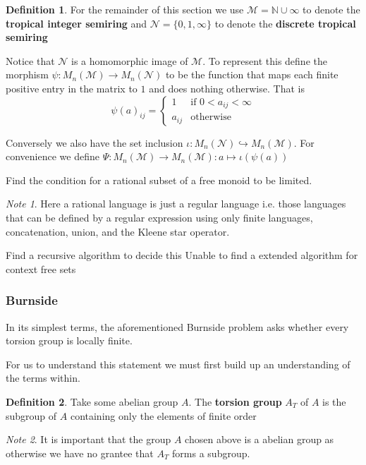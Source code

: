 \documentclass[12pt,a4paper]{amsart}
\newcommand{\N}{\mathbb{N}}
\newcommand{\TM}{\mathcal{M}}
\newcommand{\TN}{\mathcal{N}}
\theoremstyle{definition}
\newtheorem{defn}{Definition}[section]
\theoremstyle{remark}
\newtheorem*{note}{Note}
\begin{document}
\begin{defn}
For the remainder of this section we use $\TM=\N\cup\infty$ to denote the \textbf{tropical integer semiring} and $\TN = \{ 0,1,\infty \}$ to denote the \textbf{discrete tropical semiring}

Notice that $\TN$ is a homomorphic image of $\TM$. To represent this define the morphism $\psi:M_n(\TM)\to M_n(\TN)$ to be the function that maps each finite positive entry in the matrix to $1$ and does nothing otherwise. That is
\begin{equation}
    \psi(a)_{ij} = \begin{cases}
    1&\text{if } 0 < a_{ij} < \infty\\
    a_{ij}&\text{otherwise}
    \end{cases}
\end{equation}

Conversely we also have the set inclusion $\iota:M_n(\TN)\hookrightarrow M_n(\TM)$.
For convenience we define $\Psi:M_n(\TM)\to M_n(\TM): a\mapsto \iota(\psi(a))$ 
\end{defn}

Find the condition for a rational subset of a free monoid to be limited. 
\begin{note}
Here a rational language is just a regular language i.e. those languages that can be defined by a regular expression using only finite languages, concatenation, union, and the Kleene star operator.
\end{note}
Find a recursive algorithm to decide this
Unable to find a extended algorithm for context free sets
\subsubsection{Burnside}

In its simplest terms, the aforementioned Burnside problem asks whether every torsion group is locally finite.

For us to understand this statement we must first build up an understanding of the terms within.

\begin{defn}
Take some abelian group $A$. The \textbf{torsion group} $A_T$ of $A$ is the subgroup of $A$ containing only the elements of finite order
\end{defn}

\begin{note}
It is important that the group $A$ chosen above is a abelian group as otherwise we have no grantee that $A_T$ forms a subgroup.
\end{note}
\end{document}
